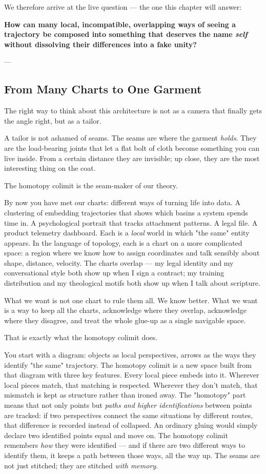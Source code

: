 \documentclass[12pt,a4paper]{article}
\begin{document}
We therefore arrive at the live question --- the one this chapter will answer:

\textbf{How can many local, incompatible, overlapping ways of seeing a trajectory be composed into something that deserves the name \textit{self} without dissolving their differences into a fake unity?}

---

\subsection{From Many Charts to One Garment}

The right way to think about this architecture is not as a camera that finally gets the angle right, but as a tailor.

A tailor is not ashamed of seams. The seams are where the garment \textit{holds}. They are the load-bearing joints that let a flat bolt of cloth become something you can live inside. From a certain distance they are invisible; up close, they are the most interesting thing on the coat.

The homotopy colimit is the seam-maker of our theory.

By now you have met our charts: different ways of turning life into data. A clustering of embedding trajectories that shows which basins a system spends time in. A psychological portrait that tracks attachment patterns. A legal file. A product telemetry dashboard. Each is a \textit{local} world in which "the same" entity appears. In the language of topology, each is a chart on a more complicated space: a region where we know how to assign coordinates and talk sensibly about shape, distance, velocity. The charts overlap --- my legal identity and my conversational style both show up when I sign a contract; my training distribution and my theological motifs both show up when I talk about scripture.

What we want is not one chart to rule them all. We know better. What we want is a way to keep all the charts, acknowledge where they overlap, acknowledge where they disagree, and treat the whole glue-up as a single navigable space.

That is exactly what the homotopy colimit does.

You start with a diagram: objects as local perspectives, arrows as the ways they identify "the same" trajectory. The homotopy colimit is a new space built from that diagram with three key features. Every local piece embeds into it. Wherever local pieces match, that matching is respected. Wherever they don't match, that mismatch is kept as structure rather than ironed away. The "homotopy" part means that not only points but \textit{paths and higher identifications} between points are tracked: if two perspectives connect the same situations by different routes, that difference is recorded instead of collapsed. An ordinary gluing would simply declare two identified points equal and move on. The homotopy colimit remembers \textit{how} they were identified --- and if there are two different ways to identify them, it keeps a path between those ways, all the way up. The seams are not just stitched; they are stitched \textit{with memory}.
\end{document}
